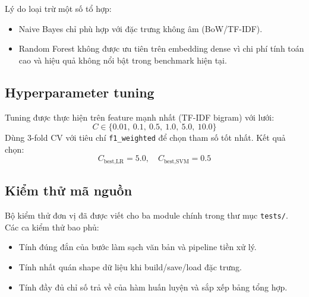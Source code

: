 Lý do loại trừ một số tổ hợp:
\begin{itemize}[nosep]
    \item Naive Bayes chỉ phù hợp với đặc trưng không âm (BoW/TF-IDF).
    \item Random Forest không được ưu tiên trên embedding dense vì chi phí tính toán cao và hiệu quả không nổi bật trong benchmark hiện tại.
\end{itemize}

\subsection{Hyperparameter tuning}
Tuning được thực hiện trên feature mạnh nhất (TF-IDF bigram) với lưới:
\begin{equation}
C \in \{0.01,\ 0.1,\ 0.5,\ 1.0,\ 5.0,\ 10.0\}
\end{equation}
Dùng 3-fold CV với tiêu chí \texttt{f1\_weighted} để chọn tham số tốt nhất. Kết quả chọn:
\begin{equation}
C_{\text{best,LR}} = 5.0, \quad C_{\text{best,SVM}} = 0.5
\end{equation}

\subsection{Kiểm thử mã nguồn}
Bộ kiểm thử đơn vị đã được viết cho ba module chính trong thư mục \texttt{tests/}. Các ca kiểm thử bao phủ:
\begin{itemize}[nosep]
    \item Tính đúng đắn của bước làm sạch văn bản và pipeline tiền xử lý.
    \item Tính nhất quán shape dữ liệu khi build/save/load đặc trưng.
    \item Tính đầy đủ chỉ số trả về của hàm huấn luyện và sắp xếp bảng tổng hợp.
\end{itemize}


